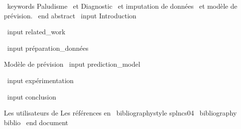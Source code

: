 \ keywords {Paludisme   \ et Diagnostic \ et imputation de données \ et modèle de prévision.}
\ end {abstract}
%
%
\ input {Introduction}

\ input {related_work}

\ input {préparation_données}

Modèle de prévision %
\ input {prediction_model}

\ input {expérimentation}

\ input {conclusion}

%
%
Les utilisateurs de %
Les références en %
%
\ bibliographystyle {splncs04}
\ bibliography {biblio}
%
\ end {document}
